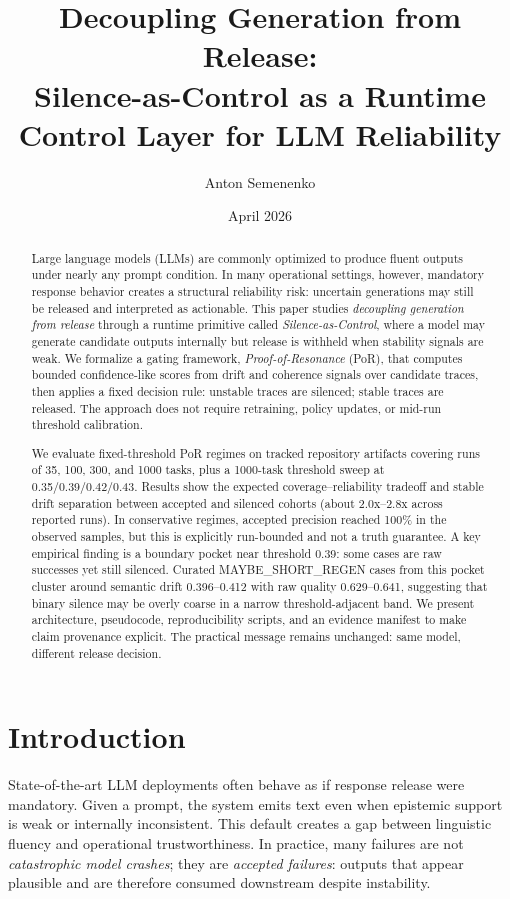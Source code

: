 \documentclass[11pt]{article}
\title{Decoupling Generation from Release:\\
Silence-as-Control as a Runtime Control Layer for LLM Reliability}
\author{Anton Semenenko}
\date{April 2026}
\begin{document}
\maketitle

\begin{abstract}
Large language models (LLMs) are commonly optimized to produce fluent outputs under nearly any prompt condition. In many operational settings, however, mandatory response behavior creates a structural reliability risk: uncertain generations may still be released and interpreted as actionable. This paper studies \emph{decoupling generation from release} through a runtime primitive called \emph{Silence-as-Control}, where a model may generate candidate outputs internally but release is withheld when stability signals are weak. We formalize a gating framework, \emph{Proof-of-Resonance} (PoR), that computes bounded confidence-like scores from drift and coherence signals over candidate traces, then applies a fixed decision rule: unstable traces are silenced; stable traces are released. The approach does not require retraining, policy updates, or mid-run threshold calibration.

We evaluate fixed-threshold PoR regimes on tracked repository artifacts covering runs of 35, 100, 300, and 1000 tasks, plus a 1000-task threshold sweep at 0.35/0.39/0.42/0.43. Results show the expected coverage--reliability tradeoff and stable drift separation between accepted and silenced cohorts (about 2.0x--2.8x across reported runs). In conservative regimes, accepted precision reached 100\% in the observed samples, but this is explicitly run-bounded and not a truth guarantee. A key empirical finding is a boundary pocket near threshold 0.39: some cases are raw successes yet still silenced. Curated MAYBE\_SHORT\_REGEN cases from this pocket cluster around semantic drift 0.396--0.412 with raw quality 0.629--0.641, suggesting that binary silence may be overly coarse in a narrow threshold-adjacent band. We present architecture, pseudocode, reproducibility scripts, and an evidence manifest to make claim provenance explicit. The practical message remains unchanged: same model, different release decision.
\end{abstract}

\section{Introduction}
State-of-the-art LLM deployments often behave as if response release were mandatory. Given a prompt, the system emits text even when epistemic support is weak or internally inconsistent. This default creates a gap between linguistic fluency and operational trustworthiness. In practice, many failures are not \emph{catastrophic model crashes}; they are \emph{accepted failures}: outputs that appear plausible and are therefore consumed downstream despite instability.
\end{document}
